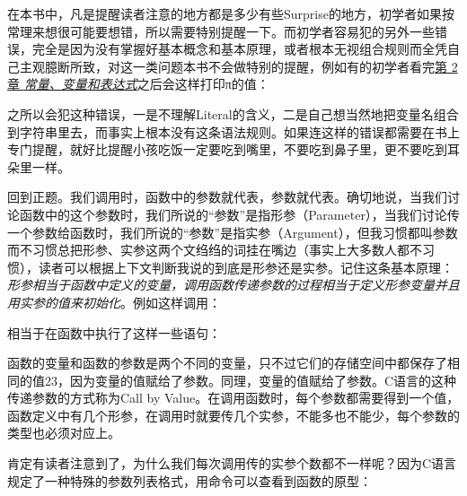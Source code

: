 在本书中，凡是提醒读者注意的地方都是多少有些Surprise的地方，初学者如果按常理来想很可能要想错，所以需要特别提醒一下。而初学者容易犯的另外一些错误，完全是因为没有掌握好基本概念和基本原理，或者根本无视组合规则而全凭自己主观臆断所致，对这一类问题本书不会做特别的提醒，例如有的初学者看完\hyperlink{db.ch02.id2707134}{第 2 章 \emph{常量、变量和表达式}}之后会这样打印π的值：




之所以会犯这种错误，一是不理解Literal的含义，二是自己想当然地把变量名组合到字符串里去，而事实上根本没有这条语法规则。如果连这样的错误都需要在书上专门提醒，就好比提醒小孩吃饭一定要吃到嘴里，不要吃到鼻子里，更不要吃到耳朵里一样。



回到正题。我们调用时，函数中的参数就代表，参数就代表。确切地说，当我们讨论函数中的这个参数时，我们所说的“参数”是指形参（Parameter），当我们讨论传一个参数给函数时，我们所说的“参数”是指实参（Argument），但我习惯都叫参数而不习惯总把形参、实参这两个文绉绉的词挂在嘴边（事实上大多数人都不习惯），读者可以根据上下文判断我说的到底是形参还是实参。记住这条基本原理：\emph{形参相当于函数中定义的变量，调用函数传递参数的过程相当于定义形参变量并且用实参的值来初始化}。例如这样调用：




相当于在函数中执行了这样一些语句：




函数的变量和函数的参数是两个不同的变量，只不过它们的存储空间中都保存了相同的值23，因为变量的值赋给了参数。同理，变量的值赋给了参数。C语言的这种传递参数的方式称为Call by Value。在调用函数时，每个参数都需要得到一个值，函数定义中有几个形参，在调用时就要传几个实参，不能多也不能少，每个参数的类型也必须对应上。



肯定有读者注意到了，为什么我们每次调用传的实参个数都不一样呢？因为C语言规定了一种特殊的参数列表格式，用命令可以查看到函数的原型：


